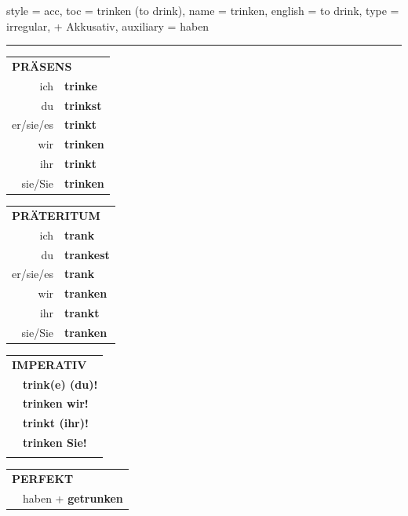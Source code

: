 \begin{verbentry}{
  style = {acc},
  toc = {trinken (to drink)},
  name = {trinken},
  english = {to drink},
  type = {irregular, + Akkusativ},
  auxiliary = {haben}
}
 
    
     \vspace{5pt}

    \hrule
    
    \vspace{5pt}

  \begin{tabular}{rl}
     \multicolumn{2}{l}{\textbf{PRÄSENS} }\\
    ich & \textbf{trinke}\\
    du & \textbf{trinkst}\\
    er/sie/es & \textbf{trinkt}\\
    wir & \textbf{trinken}\\
    ihr & \textbf{trinkt}\\
    sie/Sie & \textbf{trinken}\\
  \end{tabular}
  \hfill
     \begin{tabular}{rl}
    \multicolumn{2}{l}{\textbf{PRÄTERITUM} }\\
    ich & \textbf{trank}\\
    du & \textbf{trankest}\\
    er/sie/es & \textbf{trank}\\
    wir & \textbf{tranken}\\
    ihr & \textbf{trankt}\\
    sie/Sie & \textbf{tranken}\\
  \end{tabular}
  \hfill
  \begin{tabular}{rl}
     \multicolumn{2}{l}{\textbf{IMPERATIV} }\\
   & \textbf{trink(e) (du)!}\\
   & \textbf{trinken wir!}\\
   & \textbf{trinkt (ihr)!}\\
   & \textbf{trinken Sie!}\\
   & \vspace{10pt}
  \end{tabular}

    \vspace{10pt}

 \begin{tabular}{rl}
     \multicolumn{2}{l}{\textbf{PERFEKT}}\\
   & haben + \textbf{getrunken}\\
  \end{tabular}
\hfill
   \begin{tabular}{rl}
   

\end{tabular}
\end{verbentry}
